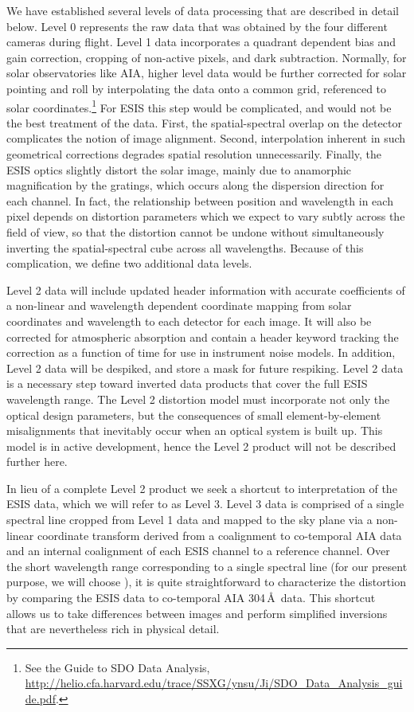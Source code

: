 We have established several levels of data processing that are described in detail below.
Level 0 represents the raw data that was obtained by the four different cameras during flight.
Level 1 data incorporates %
a quadrant dependent bias and gain correction, cropping of non-active pixels, and dark subtraction.
Normally, for solar observatories like AIA, higher level data would be further corrected for solar pointing and roll by interpolating the data onto a common grid, referenced to solar coordinates.\footnote{See the Guide to SDO Data Analysis, \url{http://helio.cfa.harvard.edu/trace/SSXG/ynsu/Ji/SDO_Data_Analysis_guide.pdf}.}  For ESIS this step would be complicated, and would not be the best treatment of the data.  
First, the spatial-spectral overlap on the detector complicates the notion of image alignment. Second, interpolation inherent in such geometrical corrections degrades spatial resolution unnecessarily.  
Finally, the ESIS optics slightly distort the solar image, mainly due to anamorphic magnification by the gratings, which occurs along the dispersion direction for each channel. 
In fact, the relationship between position and wavelength in each pixel depends on distortion parameters which we expect to vary subtly across the field of view, so that the distortion cannot be undone without simultaneously inverting the spatial-spectral cube across all wavelengths.
Because of this complication, we define two additional data levels.  

Level 2 data will include updated header information with accurate coefficients of a non-linear and wavelength dependent coordinate mapping from solar coordinates and wavelength to each detector for each image. It will also be corrected for atmospheric absorption and contain a header keyword tracking the correction as a function of time for use in instrument noise models.
In addition, Level 2 data will be despiked, and store a mask for future respiking.
Level 2 data is a necessary step toward inverted data products that cover the full ESIS wavelength range. The Level 2 distortion model must incorporate not only the optical design parameters, but the consequences of small element-by-element misalignments that inevitably occur when an optical system is built up.  This model is in active development, hence the Level 2 product will not be described further here.


In lieu of a complete Level 2 product we seek a shortcut to interpretation of the ESIS data, which  we will refer to as Level 3.
Level 3 data is comprised of a single spectral line cropped from Level 1 data and mapped to the sky plane via a non-linear coordinate transform derived from a coalignment to co-temporal AIA data and an internal coalignment of each ESIS channel to a reference channel. Over the short wavelength range corresponding to a single spectral line (for our present purpose, we will choose \ov), it is quite straightforward to characterize the distortion by comparing the ESIS data to co-temporal AIA 304\,\AA\ data. This shortcut allows us to take differences between images and perform simplified inversions that are nevertheless rich in physical detail.

